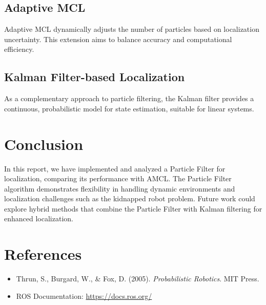 \documentclass[11pt]{article}
\begin{document}
\subsection{Adaptive MCL}
Adaptive MCL dynamically adjusts the number of particles based on localization uncertainty. This extension aims to balance accuracy and computational efficiency.

\subsection{Kalman Filter-based Localization}
As a complementary approach to particle filtering, the Kalman filter provides a continuous, probabilistic model for state estimation, suitable for linear systems.

\section{Conclusion}
In this report, we have implemented and analyzed a Particle Filter for localization, comparing its performance with AMCL. The Particle Filter algorithm demonstrates flexibility in handling dynamic environments and localization challenges such as the kidnapped robot problem. Future work could explore hybrid methods that combine the Particle Filter with Kalman filtering for enhanced localization.

\section*{References}
\begin{itemize}
    \item Thrun, S., Burgard, W., \& Fox, D. (2005). \textit{Probabilistic Robotics}. MIT Press.
    \item ROS Documentation: \url{https://docs.ros.org/}
\end{itemize}
\end{document}
